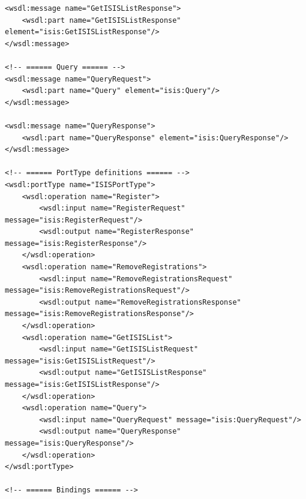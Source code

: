 \documentclass{book}
\begin{document}
\begin{verbatim}
<wsdl:message name="GetISISListResponse">
    <wsdl:part name="GetISISListResponse" element="isis:GetISISListResponse"/>
</wsdl:message>

<!-- ====== Query ====== -->
<wsdl:message name="QueryRequest">
    <wsdl:part name="Query" element="isis:Query"/>
</wsdl:message>

<wsdl:message name="QueryResponse">
    <wsdl:part name="QueryResponse" element="isis:QueryResponse"/>
</wsdl:message>

<!-- ====== PortType definitions ====== -->
<wsdl:portType name="ISISPortType">
    <wsdl:operation name="Register">
        <wsdl:input name="RegisterRequest" message="isis:RegisterRequest"/>
        <wsdl:output name="RegisterResponse" message="isis:RegisterResponse"/>
    </wsdl:operation>
    <wsdl:operation name="RemoveRegistrations">
        <wsdl:input name="RemoveRegistrationsRequest" message="isis:RemoveRegistrationsRequest"/>
        <wsdl:output name="RemoveRegistrationsResponse" message="isis:RemoveRegistrationsResponse"/>
    </wsdl:operation>
    <wsdl:operation name="GetISISList">
        <wsdl:input name="GetISISListRequest" message="isis:GetISISListRequest"/>
        <wsdl:output name="GetISISListResponse" message="isis:GetISISListResponse"/>
    </wsdl:operation>
    <wsdl:operation name="Query">
        <wsdl:input name="QueryRequest" message="isis:QueryRequest"/>
        <wsdl:output name="QueryResponse" message="isis:QueryResponse"/>
    </wsdl:operation>
</wsdl:portType>

<!-- ====== Bindings ====== -->


\end{verbatim}
\end{document}
